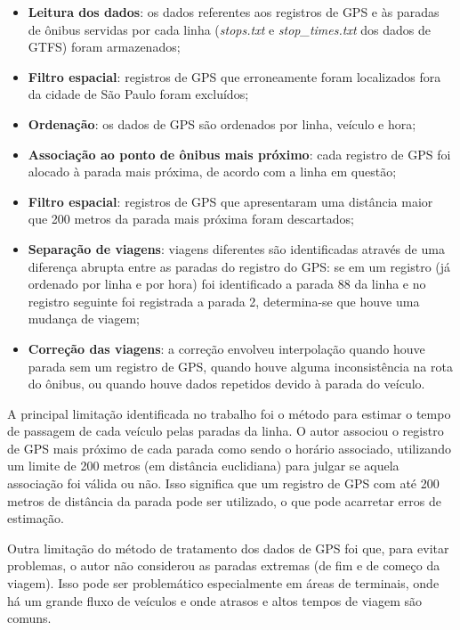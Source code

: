 \documentclass[        
    a4paper,          %
    12pt,             %
    chapter=TITLE,    %
    section=Title,    %
    subsection=Title, %
    oneside,          %
    english,          %
    spanish,          %
    brazil,           %
    fleqn             %
]{abntex2}
\begin{document}
  \begin{itemize}
  \tightlist
  \item
    \textbf{Leitura dos dados}: os dados referentes aos registros de GPS e às paradas de ônibus servidas por cada linha (\emph{stops.txt} e \emph{stop\_times.txt} dos dados de GTFS) foram armazenados;
  \item
    \textbf{Filtro espacial}: registros de GPS que erroneamente foram localizados fora da cidade de São Paulo foram excluídos;
  \item
    \textbf{Ordenação}: os dados de GPS são ordenados por linha, veículo e hora;
  \item
    \textbf{Associação ao ponto de ônibus mais próximo}: cada registro de GPS foi alocado à parada mais próxima, de acordo com a linha em questão;
  \item
    \textbf{Filtro espacial}: registros de GPS que apresentaram uma distância maior que 200 metros da parada mais próxima foram descartados;
  \item
    \textbf{Separação de viagens}: viagens diferentes são identificadas através de uma diferença abrupta entre as paradas do registro do GPS: se em um registro (já ordenado por linha e por hora) foi identificado a parada 88 da linha e no registro seguinte foi registrada a parada 2, determina-se que houve uma mudança de viagem;
  \item
    \textbf{Correção das viagens}: a correção envolveu interpolação quando houve parada sem um registro de GPS, quando houve alguma inconsistência na rota do ônibus, ou quando houve dados repetidos devido à parada do veículo.
  \end{itemize}
  
  A principal limitação identificada no trabalho foi o método para estimar o tempo de passagem de cada veículo pelas paradas da linha. O autor associou o registro de GPS mais próximo de cada parada como sendo o horário associado, utilizando um limite de 200 metros (em distância euclidiana) para julgar se aquela associação foi válida ou não. Isso significa que um registro de GPS com até 200 metros de distância da parada pode ser utilizado, o que pode acarretar erros de estimação.
  
  Outra limitação do método de tratamento dos dados de GPS foi que, para evitar problemas, o autor não considerou as paradas extremas (de fim e de começo da viagem). Isso pode ser problemático especialmente em áreas de terminais, onde há um grande fluxo de veículos e onde atrasos e altos tempos de viagem são comuns.
  
\end{document}
